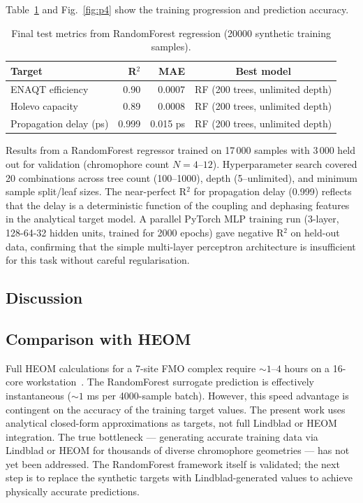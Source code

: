 \documentclass[aps,prl,twocolumn,showpacs,superscriptaddress]{revtex4-2}
\begin{document}
Table~\ref{tab:training} and Fig.~\ref{fig:p4} show the training progression and prediction accuracy.

\begin{table}[htbp]
\caption{Final test metrics from RandomForest regression (20000 synthetic training samples).}
\label{tab:training}
\centering
\begin{tabular}{lrrc}
\toprule
Target & R$^2$ & MAE & Best model \\
\midrule
ENAQT efficiency & 0.90 & 0.0007 & RF (200 trees, unlimited depth) \\
Holevo capacity & 0.89 & 0.0008 & RF (200 trees, unlimited depth) \\
Propagation delay (ps) & 0.999 & 0.015 ps & RF (200 trees, unlimited depth) \\
\bottomrule
\end{tabular}
\end{table}

Results from a RandomForest regressor trained on 17\,000 samples with 3\,000 held out for validation (chromophore count $N = 4$--$12$). Hyperparameter search covered 20 combinations across tree count (100--1000), depth (5--unlimited), and minimum sample split/leaf sizes. The near-perfect R$^2$ for propagation delay (0.999) reflects that the delay is a deterministic function of the coupling and dephasing features in the analytical target model. A parallel PyTorch MLP training run (3-layer, 128-64-32 hidden units, trained for 2000 epochs) gave negative R$^2$ on held-out data, confirming that the simple multi-layer perceptron architecture is insufficient for this task without careful regularisation.

\subsection{Discussion}

\subsection{Comparison with HEOM}

Full HEOM calculations for a 7-site FMO complex require $\sim 1$--$4$ hours on a 16-core workstation~\cite{Firmenich2026}. The RandomForest surrogate prediction is effectively instantaneous ($\sim 1$ ms per 4000-sample batch). However, this speed advantage is contingent on the accuracy of the training target values. The present work uses analytical closed-form approximations as targets, not full Lindblad or HEOM integration. The true bottleneck --- generating accurate training data via Lindblad or HEOM for thousands of diverse chromophore geometries --- has not yet been addressed. The RandomForest framework itself is validated; the next step is to replace the synthetic targets with Lindblad-generated values to achieve physically accurate predictions.
\end{document}
